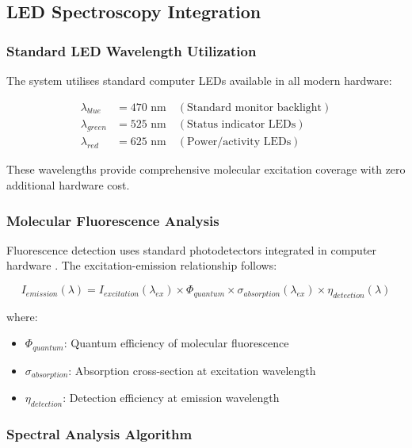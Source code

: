 \documentclass[12pt,a4paper]{article}
\begin{document}
\subsection{LED Spectroscopy Integration}

\subsubsection{Standard LED Wavelength Utilization}

The system utilises standard computer LEDs available in all modern hardware:

\begin{align}
\lambda_{blue} &= 470 \text{ nm} \quad (\text{Standard monitor backlight}) \\
\lambda_{green} &= 525 \text{ nm} \quad (\text{Status indicator LEDs}) \\
\lambda_{red} &= 625 \text{ nm} \quad (\text{Power/activity LEDs})
\end{align}

These wavelengths provide comprehensive molecular excitation coverage with zero additional hardware cost.

\subsubsection{Molecular Fluorescence Analysis}

Fluorescence detection uses standard photodetectors integrated in computer hardware \cite{lakowicz2006principles}. The excitation-emission relationship follows:

\begin{equation}
I_{emission}(\lambda) = I_{excitation}(\lambda_{ex}) \times \Phi_{quantum} \times \sigma_{absorption}(\lambda_{ex}) \times \eta_{detection}(\lambda)
\end{equation}

where:
\begin{itemize}
\item $\Phi_{quantum}$: Quantum efficiency of molecular fluorescence
\item $\sigma_{absorption}$: Absorption cross-section at excitation wavelength
\item $\eta_{detection}$: Detection efficiency at emission wavelength
\end{itemize}

\subsubsection{Spectral Analysis Algorithm}
\end{document}
